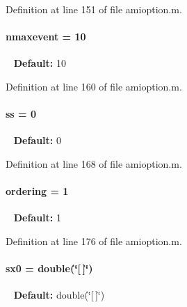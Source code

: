Definition at line 151 of file amioption.\+m.

\hypertarget{classamioption_a85519d27e7231ac625e5b2deee92165a}{}
\paragraph[{nmaxevent}]{\setlength{\rightskip}{0pt plus 5cm}nmaxevent = 10}\label{classamioption_a85519d27e7231ac625e5b2deee92165a}
~\newline
{\bfseries Default\+:} 10 

Definition at line 160 of file amioption.\+m.

\hypertarget{classamioption_a8f60c8102d29fcd525162d02eed4566b}{}
\paragraph[{ss}]{\setlength{\rightskip}{0pt plus 5cm}ss = 0}\label{classamioption_a8f60c8102d29fcd525162d02eed4566b}
~\newline
{\bfseries Default\+:} 0 

Definition at line 168 of file amioption.\+m.

\hypertarget{classamioption_aa5d555210685086c19e5d08afca6685b}{}
\paragraph[{ordering}]{\setlength{\rightskip}{0pt plus 5cm}ordering = 1}\label{classamioption_aa5d555210685086c19e5d08afca6685b}
~\newline
{\bfseries Default\+:} 1 

Definition at line 176 of file amioption.\+m.

\hypertarget{classamioption_ae40f9a7172d3a41725c151afaec347f7}{}
\paragraph[{sx0}]{\setlength{\rightskip}{0pt plus 5cm}sx0 = double(\char`\"{}\mbox{[}$\,$\mbox{]}\char`\"{})}\label{classamioption_ae40f9a7172d3a41725c151afaec347f7}
~\newline
{\bfseries Default\+:} double(\char`\"{}\mbox{[}$\,$\mbox{]}\char`\"{}) 

